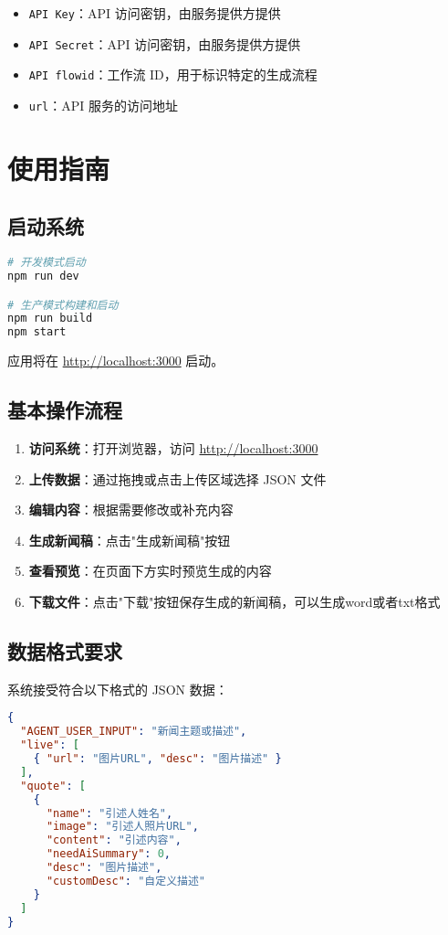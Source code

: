 \documentclass[a4paper, 12pt]{article}
\begin{document}
\begin{itemize}
    \item \texttt{API Key}：API 访问密钥，由服务提供方提供
    \item \texttt{API Secret}：API 访问密钥，由服务提供方提供
    \item \texttt{API flowid}：工作流 ID，用于标识特定的生成流程
    \item \texttt{url}：API 服务的访问地址
\end{itemize}

\section{使用指南}

\subsection{启动系统}
\begin{lstlisting}[language=bash]
# 开发模式启动
npm run dev

# 生产模式构建和启动
npm run build
npm start
\end{lstlisting}

应用将在 \url{http://localhost:3000} 启动。

\subsection{基本操作流程}
\begin{enumerate}[label=\arabic*.]
    \item \textbf{访问系统}：打开浏览器，访问 \url{http://localhost:3000}
    \item \textbf{上传数据}：通过拖拽或点击上传区域选择 JSON 文件
    \item \textbf{编辑内容}：根据需要修改或补充内容
    \item \textbf{生成新闻稿}：点击"生成新闻稿"按钮
    \item \textbf{查看预览}：在页面下方实时预览生成的内容
    \item \textbf{下载文件}：点击"下载"按钮保存生成的新闻稿，可以生成word或者txt格式
\end{enumerate}

\subsection{数据格式要求}
系统接受符合以下格式的 JSON 数据：

\begin{lstlisting}[language=json, caption=标准输入数据格式]
{
  "AGENT_USER_INPUT": "新闻主题或描述",
  "live": [
    { "url": "图片URL", "desc": "图片描述" }
  ],
  "quote": [
    {
      "name": "引述人姓名",
      "image": "引述人照片URL",
      "content": "引述内容",
      "needAiSummary": 0,
      "desc": "图片描述",
      "customDesc": "自定义描述"
    }
  ]
}
\end{lstlisting}
\end{document}
